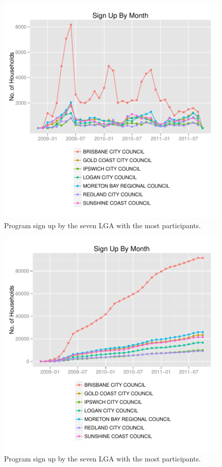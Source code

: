 \documentclass[a4paper,11pt]{article}
\begin{document}
\begin{figure}
\begin{center}
\includegraphics[width=1\textwidth]{figures/PartSignUpByLga1.pdf}
\caption{Program sign up by the seven LGA with the most participants.}
\end{center}
\end{figure}
\begin{figure}
\begin{center}
\includegraphics[width=1\textwidth]{figures/PartSignUpByLga2.pdf}
\caption{Program sign up by the seven LGA with the most participants.}
\end{center}
\end{figure}
\end{document}
